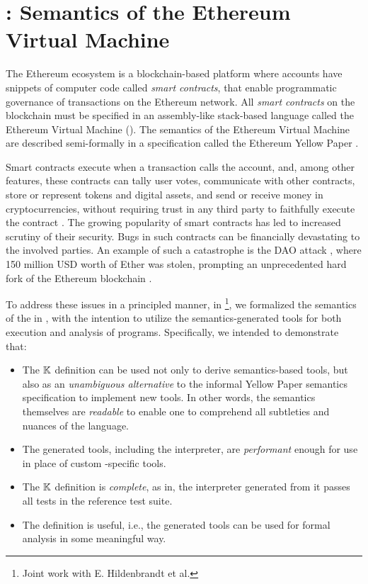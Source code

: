 \section{\KEVM: Semantics of the Ethereum Virtual Machine}\label{sec:kevm}

The Ethereum ecosystem is a blockchain-based platform where accounts
have snippets of computer code called \emph{smart contracts}, that
enable programmatic governance of transactions on the Ethereum network.
All \emph{smart contracts} on the blockchain
must be specified in an assembly-like stack-based language called
the Ethereum Virtual Machine (\EVM{}). The semantics of the
Ethereum Virtual Machine are described semi-formally in a specification
called the Ethereum Yellow Paper \cite{WoodReport14}.

Smart contracts execute when a transaction calls the account, and, among other features,
these contracts can tally user votes, communicate with other contracts,
store or represent tokens and digital assets, and send or receive money in
cryptocurrencies, without requiring trust in any third party to faithfully
execute the contract \cite{SzaboReport94,PetersBook16}.
The growing popularity of smart contracts has led to increased scrutiny of their security.
Bugs in such contracts can be financially devastating to the involved parties.
An example of such a catastrophe is the DAO attack \cite{delCastilloReport16},
 where 150 million USD worth of Ether was stolen,
 prompting an unprecedented hard fork of the Ethereum blockchain
 \cite{DaianReport16}.

To address these issues in a principled manner, in \cite{HildenbrandtCSF18}
\footnote{Joint work with E. Hildenbrandt et al.},
we formalized the semantics of the \EVM{} in \K{}, with the intention to
utilize the semantics-generated tools for both execution and analysis of \KEVM{}
programs. Specifically, we intended to demonstrate that:

\begin{itemize}
  \item The $\mathbb{K}$ definition can be used not only to derive semantics-based
  tools, but also as an \emph{unambiguous alternative} to the
  informal Yellow Paper semantics specification to implement new tools. In other
  words, the semantics themselves are \emph{readable} to enable one to
  comprehend all subtleties and nuances of the language.
  \item The generated tools, including the interpreter, are \emph{performant}
  enough for use in place of custom \EVM{}-specific tools.
  \item  The $\mathbb{K}$ definition is \emph{complete}, as in, the interpreter
  generated from it passes all tests in the reference test suite.
  \item The definition is useful, i.e., the generated tools can be used for
  formal analysis in some meaningful way.
\end{itemize}

